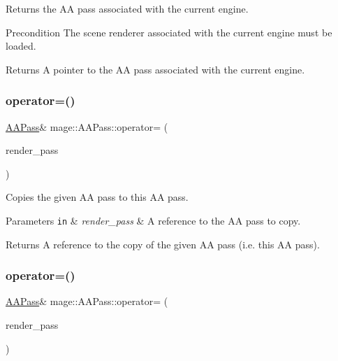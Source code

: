 Returns the AA pass associated with the current engine.

\begin{DoxyPrecond}{Precondition}
The scene renderer associated with the current engine must be loaded. 
\end{DoxyPrecond}
\begin{DoxyReturn}{Returns}
A pointer to the AA pass associated with the current engine. 
\end{DoxyReturn}
\hypertarget{classmage_1_1_a_a_pass_a6ca1b1c932026a4270b5e738c2d63b40}{}\label{classmage_1_1_a_a_pass_a6ca1b1c932026a4270b5e738c2d63b40} 
\subsubsection{\texorpdfstring{operator=()}{operator=()}\hspace{0.1cm}{\footnotesize\ttfamily [1/2]}}
{\footnotesize\ttfamily \hyperlink{classmage_1_1_a_a_pass}{A\+A\+Pass}\& mage\+::\+A\+A\+Pass\+::operator= (\begin{DoxyParamCaption}\item[{const \hyperlink{classmage_1_1_a_a_pass}{A\+A\+Pass} \&}]{render\+\_\+pass }\end{DoxyParamCaption})\hspace{0.3cm}{\ttfamily [delete]}}

Copies the given AA pass to this AA pass.


\begin{DoxyParams}[1]{Parameters}
\mbox{\tt in}  & {\em render\+\_\+pass} & A reference to the AA pass to copy. \\
\hline
\end{DoxyParams}
\begin{DoxyReturn}{Returns}
A reference to the copy of the given AA pass (i.\+e. this AA pass). 
\end{DoxyReturn}
\hypertarget{classmage_1_1_a_a_pass_a30ea0c8c3eb57cb4995cb3232bde6514}{}\label{classmage_1_1_a_a_pass_a30ea0c8c3eb57cb4995cb3232bde6514} 
\subsubsection{\texorpdfstring{operator=()}{operator=()}\hspace{0.1cm}{\footnotesize\ttfamily [2/2]}}
{\footnotesize\ttfamily \hyperlink{classmage_1_1_a_a_pass}{A\+A\+Pass}\& mage\+::\+A\+A\+Pass\+::operator= (\begin{DoxyParamCaption}\item[{\hyperlink{classmage_1_1_a_a_pass}{A\+A\+Pass} \&\&}]{render\+\_\+pass }\end{DoxyParamCaption})\hspace{0.3cm}{\ttfamily [delete]}}

